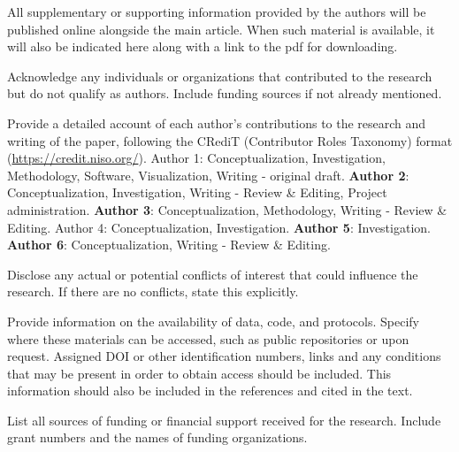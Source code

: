 \documentclass[OA]{nbr_article}
\begin{document}
	\begin{bmsec}
		All supplementary or supporting information provided by the authors will be published online alongside the main article. When such material is available, it will also be indicated here along with a link to the pdf for downloading.
	\end{bmsec}
	
	\begin{ack}%
		Acknowledge any individuals or organizations that contributed to the research but do not qualify as authors. Include funding sources if not already mentioned.
	\end{ack}
	
	\begin{bmsec}
		Provide a detailed account of each author’s contributions to the research and writing of the paper, following the CRediT (Contributor Roles Taxonomy) format (\url{https://credit.niso.org/}). 
		{Author 1}: Conceptualization, Investigation, Methodology, Software, Visualization, Writing - original draft. \textbf{Author 2}: Conceptualization, Investigation, Writing - Review \& Editing, Project administration. \textbf{Author 3}: Conceptualization, Methodology, Writing - Review \& Editing. Author 4: Conceptualization, Investigation. \textbf{Author 5}: Investigation. \textbf{Author 6}: Conceptualization, Writing - Review \& Editing.
	\end{bmsec}
	
	\begin{bmsec}
		Disclose any actual or potential conflicts of interest that could influence the research. If there are no conflicts, state this explicitly.\
	\end{bmsec}
	
	\begin{datres}%
		Provide information on the availability of data, code, and protocols. Specify where these materials can be accessed, such as public repositories or upon request. Assigned DOI or other identification numbers, links and any conditions that may be present in order to obtain access should be included. This information should also be included in the references and cited in the text.
		
	\end{datres}
	
	\begin{bmsec}
		List all sources of funding or financial support received for the research. Include grant numbers and the names of funding organizations.\
	\end{bmsec}
	
\end{document}
